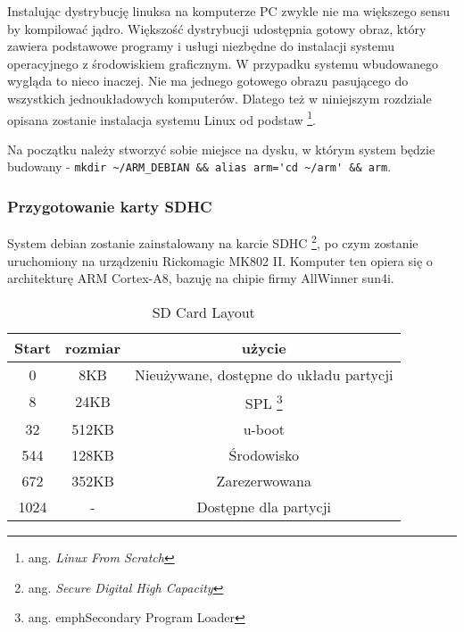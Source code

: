 Instalując dystrybucję linuksa na komputerze PC zwykle nie ma większego sensu by kompilować jądro. Większość dystrybucji udostępnia gotowy obraz, który zawiera podstawowe programy i usługi niezbędne do instalacji systemu operacyjnego z środowiskiem graficznym. W przypadku systemu wbudowanego wygląda to nieco inaczej. Nie ma jednego gotowego obrazu pasującego do wszystkich jednoukładowych komputerów. Dlatego też w niniejszym rozdziale opisana zostanie instalacja systemu Linux od podstaw \footnote{ang. \emph{Linux From Scratch}}.

\par


Na początku należy stworzyć sobie miejsce na dysku, w którym system będzie budowany - \lstinline{mkdir ~/ARM_DEBIAN && alias arm='cd ~/arm' && arm}.

\subsubsection{Przygotowanie karty SDHC}


System debian zostanie zainstalowany na karcie SDHC \footnote{ang. \em{Secure Digital High Capacity}}, po czym zostanie uruchomiony na urządzeniu Rickomagic MK802 II. Komputer ten opiera się o architekturę ARM Cortex-A8, bazuję na chipie firmy AllWinner sun4i.
\par
	\begin{table}[t]
		\centering
		\caption{SD Card Layout}
		\label{tab:sd-layout}
	\begin{tabular}{|c|c|c|}
	\hline
	\textbf{Start} & \textbf{rozmiar} & \textbf{użycie} \\ 
	\hline
	0 & 8KB & Nieużywane, dostępne do układu partycji \\
	\hline
	8 & 24KB & SPL \footnote{ang. emph{Secondary Program Loader}} \\
	\hline
	32 & 512KB & u-boot \\
	\hline
	544 & 128KB & Środowisko \\
	\hline
	672 & 352KB & Zarezerwowana \\
	\hline
	1024 & - & Dostępne dla partycji \\
	\hline
	
	
\end{tabular}
\end{table}

